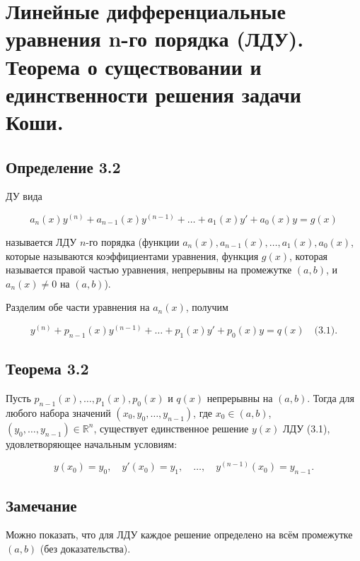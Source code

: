 {
	\section{Линейные дифференциальные уравнения n-го порядка (ЛДУ). Теорема о существовании и единственности
	решения задачи Коши.}

	\subsection*{Определение 3.2}

	ДУ вида


	\[
	a_n(x)y^{(n)} + a_{n-1}(x)y^{(n-1)} + \ldots + a_1(x)y' + a_0(x)y = g(x)
	\]


	называется ЛДУ \( n \)-го порядка (функции \( a_n(x), a_{n-1}(x), \ldots, a_1(x), a_0(x) \), которые называются коэффициентами уравнения, функция \( g(x) \), которая называется правой частью уравнения, непрерывны на промежутке \( (a, b) \), и \( a_n(x) \neq 0 \) на \( (a, b) \)).

	Разделим обе части уравнения на \( a_n(x) \), получим


	\[
	y^{(n)} + p_{n-1}(x)y^{(n-1)} + \ldots + p_1(x)y' + p_0(x)y = q(x) \quad \text{(3.1)}.
	\]

	\subsection*{Теорема 3.2}

	Пусть \( p_{n-1}(x), \ldots, p_1(x), p_0(x) \) и \( q(x) \) непрерывны на \( (a, b) \). Тогда для любого набора значений \( (x_0, y_0, \ldots, y_{n-1}) \), где \( x_0 \in (a, b) \), \( (y_0, \ldots, y_{n-1}) \in \mathbb{R}^n \), существует единственное решение \( y(x) \) ЛДУ (3.1), удовлетворяющее начальным условиям:
	
	
	\[
	y(x_0) = y_0, \quad y'(x_0) = y_1, \quad \ldots, \quad y^{(n-1)}(x_0) = y_{n-1}.
	\]	

	\subsection*{Замечание}

	Можно показать, что для ЛДУ каждое решение определено на всём промежутке \( (a, b) \) (без доказательства).



	\newpage
}